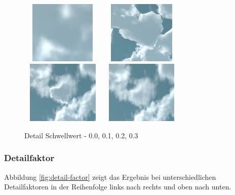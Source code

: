 \begin{figure}[H]
    \centering
    \includegraphics[width=4cm, height=3cm]{media/detail-threshold-0.0.png}
    \includegraphics[width=4cm, height=3cm]{media/detail-threshold-0.1.png}
    \includegraphics[width=4cm, height=3cm]{media/detail-threshold-0.2.png}
    \includegraphics[width=4cm, height=3cm]{media/detail-threshold-0.3.png}
    \caption{Detail Schwellwert - 0.0, 0.1, 0.2, 0.3}
    \label{fig:detail-threshold}
\end{figure}

\subsubsection{Detailfaktor}
Abbildung \ref{fig:detail-factor} zeigt das Ergebnis bei unterschiedlichen Detailfaktoren in der Reihenfolge links nach rechts und oben nach unten.


